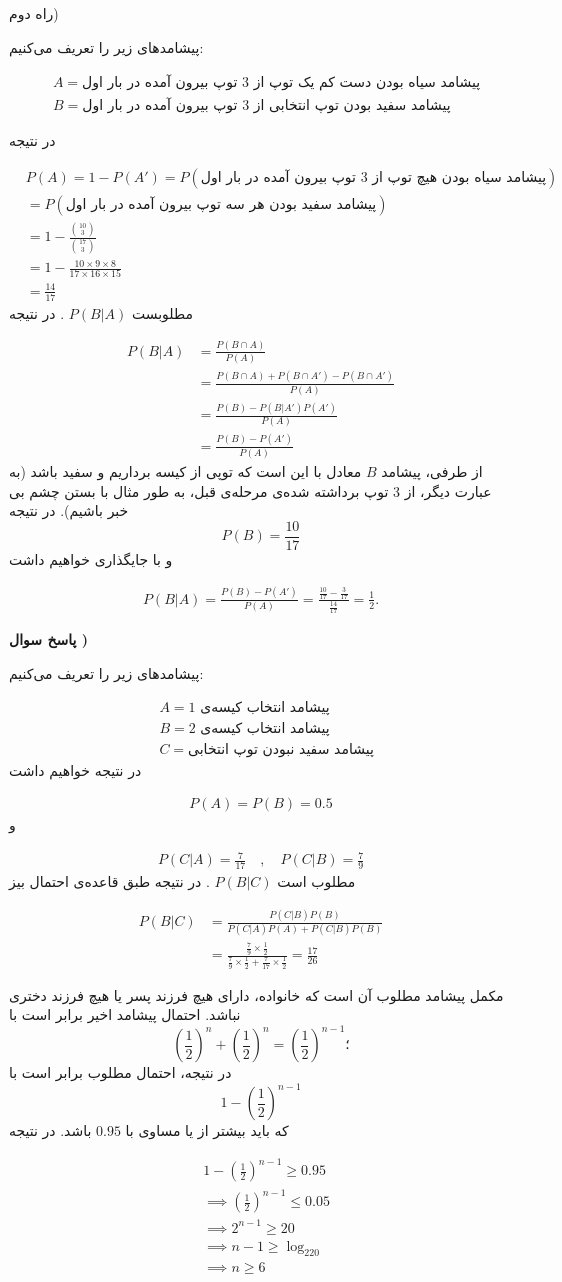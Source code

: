 \documentclass[10pt,letterpaper]{report}
\newcounter{questionanswernumber}
\newcommand{\QA}{
\textbf{پاسخ سوال \thequestionanswernumber)}
\stepcounter{questionanswernumber}
}
\newcommand{\eqn}[1]{
\[\begin{split}
#1
\end{split}\]
}
\begin{document}
راه دوم)

پیشامدهای زیر را تعریف می‌کنیم:
\eqn{
&
A=\text{
پیشامد سیاه بودن دست کم یک توپ از 3 توپ بیرون آمده در بار اول
}
\\&
B=\text{
پیشامد سفید بودن توپ انتخابی از 3 توپ بیرون آمده در بار اول
}
}{}

در نتیجه
\eqn{
&P(A)=1-P(A')=P(\text{
پیشامد سیاه بودن هیچ توپ از 3 توپ بیرون آمده در بار اول
})
\\&=
P(\text{
پیشامد سفید بودن هر سه توپ بیرون آمده در بار اول
})
\\&=
1-\frac{\binom{10}{3}}{\binom{17}{3}}
\\&=
1-\frac{10\times 9\times 8}{17\times 16\times 15}
\\&=
\frac{14}{17}
}{}
مطلوبست
$
P(B|A)
$
. در نتیجه
\eqn{
P(B|A)&=\frac{P(B\cap A)}{P(A)}
\\&=\frac{P(B\cap A)+P(B\cap A')-P(B\cap A')}{P(A)}
\\&=\frac{P(B)-P(B|A')P(A')}{P(A)}
\\&=\frac{P(B)-P(A')}{P(A)}
}{}
از طرفی، پیشامد $B$ معادل با این است که توپی از کیسه برداریم و سفید باشد (به عبارت دیگر، از 3 توپ برداشته شده‌ی مرحله‌ی قبل، به طور مثال با بستن چشم بی خبر باشیم). در نتیجه
$$
P(B)=\frac{10}{17}
$$
و با جایگذاری خواهیم داشت
\eqn{
P(B|A)=\frac{P(B)-P(A')}{P(A)}
=\frac{\frac{10}{17}-\frac{3}{17}}{\frac{14}{17}}=\frac{1}{2}.
}{}















\QA

پیشامدهای زیر را تعریف می‌کنیم:
\eqn{
&
A=\text{
پیشامد انتخاب کیسه‌ی 1
}
\\&
B=\text{
پیشامد انتخاب کیسه‌ی 2
}
\\&
C=\text{
پیشامد سفید نبودن توپ انتخابی
}
}{}
در نتیجه خواهیم داشت
\eqn{
P(A)=P(B)=0.5
}{}
و
\eqn{
P(C|A)=\frac{7}{17}\quad,\quad P(C|B)=\frac{7}{9}
}{}
مطلوب است 
$P(B|C)$
. در نتیجه طبق قاعده‌ی احتمال بیز
\eqn{
P(B|C)&=\frac{P(C|B)P(B)}{P(C|A)P(A)+P(C|B)P(B)}
\\&=
\frac{
\frac{7}{9}\times \frac{1}{2}
}{
\frac{7}{9}\times \frac{1}{2}
+
\frac{7}{17}\times \frac{1}{2}
}=\frac{17}{26}
}{}

مکمل پیشامد مطلوب آن است که خانواده، دارای هیچ فرزند پسر یا هیچ فرزند دختری نباشد. احتمال پیشامد اخیر برابر است با
$$
(\frac{1}{2})^n+(\frac{1}{2})^n=(\frac{1}{2})^{n-1}؛
$$
در نتیجه، احتمال مطلوب برابر است با
$$
1-(\frac{1}{2})^{n-1}
$$
که باید بیشتر از یا مساوی با $0.95$ باشد. در نتیجه
\eqn{
&1-(\frac{1}{2})^{n-1}\ge 0.95
\\&\implies
(\frac{1}{2})^{n-1}\le 0.05
\\&\implies
2^{n-1}\ge 20
\\&\implies
n-1\ge \log_220
\\&\implies
n\ge 6
}{}
\end{document}
